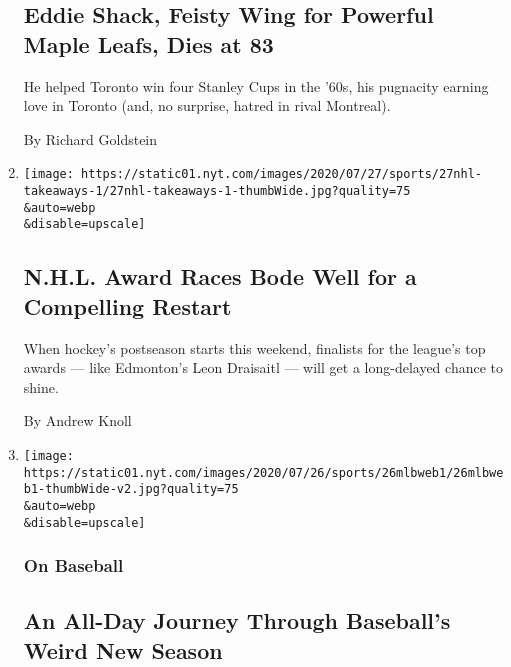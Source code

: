 \begin{enumerate}
  \hypertarget{eddie-shack-feisty-wing-for-powerful-maple-leafs-dies-at-83}{%
  \subsection{Eddie Shack, Feisty Wing for Powerful Maple Leafs, Dies at
  83}\label{eddie-shack-feisty-wing-for-powerful-maple-leafs-dies-at-83}}

  He helped Toronto win four Stanley Cups in the '60s, his pugnacity
  earning love in Toronto (and, no surprise, hatred in rival Montreal).

  By Richard Goldstein
\item
  \href{/2020/07/27/sports/hockey/nhl-awards-restart-postseason.html}{}

  \texttt{[image: https://static01.nyt.com/images/2020/07/27/sports/27nhl-takeaways-1/27nhl-takeaways-1-thumbWide.jpg?quality=75\\\&auto=webp\\\&disable=upscale]}

  \hypertarget{nhl-award-races-bode-well-for-a-compelling-restart}{%
  \subsection{N.H.L. Award Races Bode Well for a Compelling
  Restart}\label{nhl-award-races-bode-well-for-a-compelling-restart}}

  When hockey's postseason starts this weekend, finalists for the
  league's top awards --- like Edmonton's Leon Draisaitl --- will get a
  long-delayed chance to shine.

  By Andrew Knoll
\item
  \href{/2020/07/26/sports/baseball/mlb-season.html}{}

  \texttt{[image: https://static01.nyt.com/images/2020/07/26/sports/26mlbweb1/26mlbweb1-thumbWide-v2.jpg?quality=75\\\&auto=webp\\\&disable=upscale]}

  \hypertarget{on-baseball-1}{%
  \subsubsection{On Baseball}\label{on-baseball-1}}

  \hypertarget{an-all-day-journey-through-baseballs-weird-new-season}{%
  \subsection{An All-Day Journey Through Baseball's Weird New
  Season}\label{an-all-day-journey-through-baseballs-weird-new-season}}


\end{enumerate}
